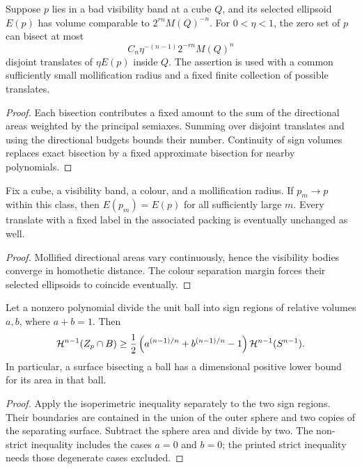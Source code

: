 \begin{lemma}
\label{lem:cv-bisections}
Suppose $p$ lies in a bad visibility band at a cube $Q$, and its
selected ellipsoid $E(p)$ has volume comparable to
$2^{rn}M(Q)^{-n}$. For $0<\eta<1$, the zero set of $p$ can bisect
at most
\[
                     C_n\eta^{-(n-1)}2^{-rn}M(Q)^n
\]
disjoint translates of $\eta E(p)$ inside $Q$. The assertion is used
with a common sufficiently small mollification radius and a fixed
finite collection of possible translates.
\end{lemma}
\begin{proof}
Each bisection contributes a fixed amount to the sum of the
directional areas weighted by the principal semiaxes. Summing over
disjoint translates and using the directional budgets bounds their
number. Continuity of sign volumes replaces exact bisection by a
fixed approximate bisection for nearby polynomials.
\end{proof}

\begin{lemma}
\label{lem:cv-stability}
Fix a cube, a visibility band, a colour, and a mollification radius.
If $p_m\to p$ within this class, then $E(p_m)=E(p)$ for all
sufficiently large $m$. Every translate with a fixed label in the
associated packing is eventually unchanged as well.
\end{lemma}
\begin{proof}
Mollified directional areas vary continuously, hence the visibility
bodies converge in homothetic distance. The colour separation margin
forces their selected ellipsoids to coincide eventually.
\end{proof}

\begin{lemma}
\label{lem:cv-isoperimetric}
Let a nonzero polynomial divide the unit ball into sign regions of
relative volumes $a,b$, where $a+b=1$. Then
\[
 \mathcal{H}^{n-1}(Z_p\cap B)
 \geq\frac12\left(a^{(n-1)/n}+b^{(n-1)/n}-1\right)
                      \mathcal{H}^{n-1}(S^{n-1}).
\]
In particular, a surface bisecting a ball has a dimensional positive
lower bound for its area in that ball.
\end{lemma}
\begin{proof}
Apply the isoperimetric inequality separately to the two sign regions.
Their boundaries are contained in the union of the outer sphere and
two copies of the separating surface. Subtract the sphere area and
divide by two. The non-strict inequality includes the cases $a=0$
and $b=0$; the printed strict inequality needs those degenerate cases
excluded.
\end{proof}

